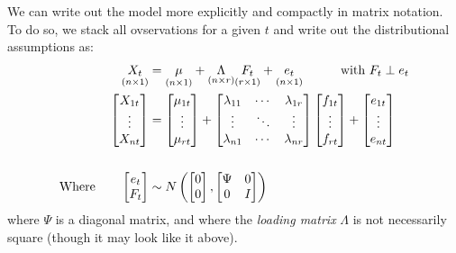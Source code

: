 \documentclass[12pt]{article}
\theoremstyle{plain}
\theoremstyle{definition}
\theoremstyle{remark}
\begin{document}
We can write out the model more explicitly and compactly in matrix
notation.  To do so, we stack all ovservations for a given $t$ and write
out the distributional assumptions as:
\begin{align}
  \underset{(n \times 1)}{X_t} &= \underset{(n \times 1)}{\mu} + 
    \underset{(n \times r)}{\Lambda} \underset{(r \times 1)}{F_t}
    + \underset{(n \times 1)}{e_t} 
    \qquad\quad \text{with } F_t \perp e_t
    \notag\\
  \begin{bmatrix} X_{1t} \\ \vdots \\ X_{nt} \end{bmatrix}
    &= \begin{bmatrix} \mu_{1t} \\ \vdots \\ \mu_{rt} \end{bmatrix}+
        \begin{bmatrix} 
          \lambda_{11} & \cdots & \lambda_{1r} \\
          \vdots & \ddots & \vdots \\
          \lambda_{n1} & \cdots & \lambda_{nr} 
        \end{bmatrix}
      \begin{bmatrix} f_{1t} \\ \vdots \\ f_{rt} \end{bmatrix}
      +  \begin{bmatrix} e_{1t} \\ \vdots \\ e_{nt} \end{bmatrix}
      \label{fm} \\\notag\\
  \text{Where} \qquad
    \begin{bmatrix} e_t \\ F_t \end{bmatrix} &\sim
    N\left(
      \begin{bmatrix} 0 \\ 0 \end{bmatrix} ,
      \begin{bmatrix} 
        \Psi & 0 \\
        0 & I \\
      \end{bmatrix}
      \right)\notag
\end{align}
where $\Psi$ is a diagonal matrix, and where the \emph{loading matrix}
$\Lambda$ is not necessarily square (though it may look like it above).





\end{document}
